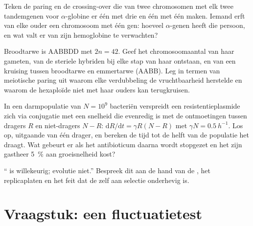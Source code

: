 \begin{exercise}[$\star\star$]\label{exo:b2:genome-diversification:9}
Teken de paring en de crossing-over die van twee chromosomen met elk twee
tandemgenen voor $\alpha$-globine er één met drie en één met één maken.
Iemand erft van elke ouder een chromosoom met één gen: hoeveel
$\alpha$-genen heeft die persoon, en wat valt er van zijn hemoglobine te
verwachten?
\end{exercise}

\begin{exercise}[$\star\star\star$]\label{exo:b2:genome-diversification:10}
Broodtarwe is AABBDD met $2n = 42$. Geef het chromosoomaantal van haar
gameten, van de steriele hybriden bij elke stap van haar ontstaan, en van
een kruising tussen broodtarwe en emmertarwe (AABB). Leg in termen van
meiotische paring uit waarom elke verdubbeling de vruchtbaarheid
herstelde en waarom de hexaploïde niet met haar ouders kan terugkruisen.
\end{exercise}

\begin{exercise}[$\star\star\star$]\label{exo:b2:genome-diversification:11}
In een darmpopulatie van $N = 10^{9}$ bacteriën verspreidt een
resistentieplasmide zich via conjugatie met een snelheid die evenredig is
met de ontmoetingen tussen dragers $R$ en niet-dragers $N - R$: $\mathrm{d}R/\mathrm{d}t =
\gamma R (N - R)$ met $\gamma N = \qty{0.5}{h^{-1}}$. Los op, uitgaande van één drager, en
bereken de tijd tot de helft van de populatie het  draagt. Wat
gebeurt er als het antibioticum daarna wordt stopgezet en het 
zijn gastheer \qty{5}{\%} aan groeisnelheid kost?
\end{exercise}

\begin{exercise}[$\star\star\star$]\label{exo:b2:genome-diversification:12}
`` is willekeurig; evolutie niet.'' Bespreek dit aan de hand van
de , het replicaplaten en het feit dat de 
zelf aan selectie onderhevig is.
\end{exercise}

\section{Vraagstuk: een fluctuatietest}

